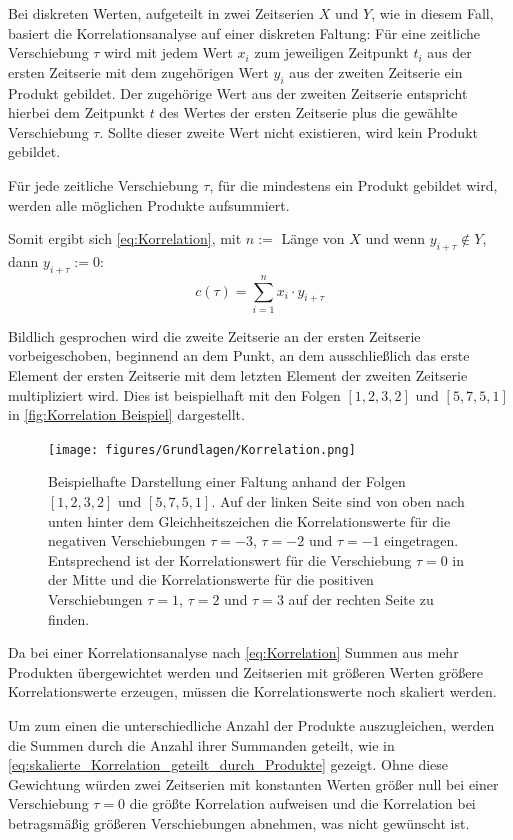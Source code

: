 Bei diskreten Werten, aufgeteilt in zwei Zeitserien $X$ und $Y$, wie in diesem Fall, basiert die Korrelationsanalyse auf einer diskreten Faltung:
Für eine zeitliche Verschiebung $\tau$ wird mit jedem Wert $x_i$ zum jeweiligen Zeitpunkt $t_i$ aus der ersten Zeitserie mit dem zugehörigen Wert $y_i$ aus der zweiten Zeitserie ein Produkt gebildet. Der zugehörige Wert aus der zweiten Zeitserie entspricht hierbei dem Zeitpunkt $t$ des Wertes der ersten Zeitserie plus die gewählte Verschiebung $\tau$. Sollte dieser zweite Wert nicht existieren, wird kein Produkt gebildet.

Für jede zeitliche Verschiebung $\tau$, für die mindestens ein Produkt gebildet wird, werden alle möglichen Produkte aufsummiert.

Somit ergibt sich \autoref{eq:Korrelation}, mit $n := $ Länge von $X$ und wenn $y_{i+\tau} \not\in Y$, dann $y_{i+\tau} := 0$:
\begin{equation}\label{eq:Korrelation}
    c(\tau) = \sum_{i=1}^n x_i\cdot y_{i+\tau}
\end{equation}


Bildlich gesprochen wird die zweite Zeitserie an der ersten Zeitserie vorbeigeschoben, beginnend an dem Punkt, an dem ausschließlich das erste Element der ersten Zeitserie mit dem letzten Element der zweiten Zeitserie multipliziert wird. Dies ist beispielhaft mit den Folgen $[1,2,3,2]$ und $[5,7,5,1]$ in \autoref{fig:Korrelation Beispiel} dargestellt.

\begin{figure}[H]
    \centering
    \texttt{[image: figures/Grundlagen/Korrelation.png]}
    \caption{Beispielhafte Darstellung einer Faltung anhand der Folgen $[1,2,3,2]$ und $[5,7,5,1]$. Auf der linken Seite sind von oben nach unten hinter dem Gleichheitszeichen die Korrelationswerte für die negativen Verschiebungen $\tau=-3$, $\tau=-2$ und $\tau=-1$ eingetragen. Entsprechend ist der Korrelationswert für die Verschiebung $\tau=0$ in der Mitte und die Korrelationswerte für die positiven Verschiebungen $\tau=1$, $\tau=2$ und $\tau=3$ auf der rechten Seite zu finden.}
    \label{fig:Korrelation Beispiel}
\end{figure}

Da bei einer Korrelationsanalyse nach \autoref{eq:Korrelation} Summen aus mehr Produkten übergewichtet werden und Zeitserien mit größeren Werten größere Korrelationswerte erzeugen, müssen die Korrelationswerte noch skaliert werden.

Um zum einen die unterschiedliche Anzahl der Produkte auszugleichen, werden die Summen durch die Anzahl ihrer Summanden geteilt, wie in \autoref{eq:skalierte_Korrelation_geteilt_durch_Produkte} gezeigt. Ohne diese Gewichtung würden zwei Zeitserien mit konstanten Werten größer null bei einer Verschiebung $\tau=0$ die größte Korrelation aufweisen und die Korrelation bei betragsmäßig größeren Verschiebungen abnehmen, was nicht gewünscht ist.

